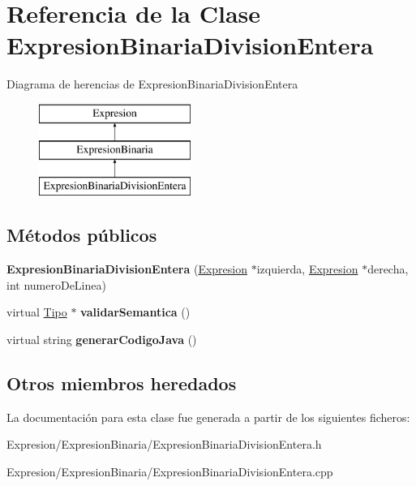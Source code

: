 \hypertarget{class_expresion_binaria_division_entera}{\section{Referencia de la Clase Expresion\-Binaria\-Division\-Entera}
\label{class_expresion_binaria_division_entera}
}
Diagrama de herencias de Expresion\-Binaria\-Division\-Entera\begin{figure}[H]
\begin{center}
\leavevmode
\includegraphics[height=3.000000cm]{class_expresion_binaria_division_entera}
\end{center}
\end{figure}
\subsection*{Métodos públicos}
\begin{DoxyCompactItemize}
\item 
\hypertarget{class_expresion_binaria_division_entera_abfa494a119bf9bcedff18ae5a7728e12}{{\bfseries Expresion\-Binaria\-Division\-Entera} (\hyperlink{class_expresion}{Expresion} $\ast$izquierda, \hyperlink{class_expresion}{Expresion} $\ast$derecha, int numero\-De\-Linea)}\label{class_expresion_binaria_division_entera_abfa494a119bf9bcedff18ae5a7728e12}

\item 
\hypertarget{class_expresion_binaria_division_entera_a9c7ca80abec8d851fb71e0e6af0fc116}{virtual \hyperlink{class_tipo}{Tipo} $\ast$ {\bfseries validar\-Semantica} ()}\label{class_expresion_binaria_division_entera_a9c7ca80abec8d851fb71e0e6af0fc116}

\item 
\hypertarget{class_expresion_binaria_division_entera_acb72c82d5c5b95a84d71573970b3c0b0}{virtual string {\bfseries generar\-Codigo\-Java} ()}\label{class_expresion_binaria_division_entera_acb72c82d5c5b95a84d71573970b3c0b0}

\end{DoxyCompactItemize}
\subsection*{Otros miembros heredados}


La documentación para esta clase fue generada a partir de los siguientes ficheros\-:\begin{DoxyCompactItemize}
\item 
Expresion/\-Expresion\-Binaria/Expresion\-Binaria\-Division\-Entera.\-h\item 
Expresion/\-Expresion\-Binaria/Expresion\-Binaria\-Division\-Entera.\-cpp\end{DoxyCompactItemize}
